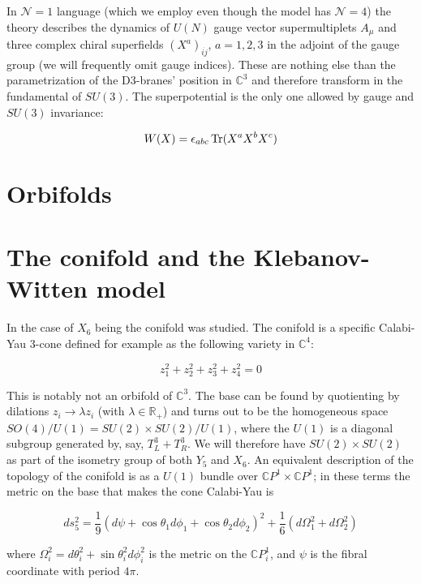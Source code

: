 In $\mathcal{N}=1$ language (which we employ even though the model has $\mathcal{N}=4$) the theory describes the dynamics of $U(N)$ gauge vector supermultiplets $A_\mu$ and three complex chiral superfields $(X^a)_{i\dot j}$, $a=1,2,3$ in the adjoint of the gauge group (we will frequently omit gauge indices). These are nothing else than the parametrization of the D3-branes' position in $\mathbb{C}^3$ and therefore transform in the fundamental of $SU(3)$. The superpotential is the only one allowed by gauge and $SU(3)$ invariance:

\begin{equation} W(X) = \epsilon_{abc} \operatorname{Tr} ( X^a X^b X^c) \end{equation}

\section{Orbifolds}

\section{The conifold and the Klebanov-Witten model}

In \cite{KW_SCFT} the case of $X_6$ being the conifold was studied. The conifold is a specific Calabi-Yau 3-cone defined for example as the following variety in $\mathbb{C}^4$:

\begin{equation}
	z_1^2 + z_2^2 + z_3^2 + z_4^2 = 0
\end{equation}

This is notably not an orbifold of $\mathbb{C}^3$. The base can be found by quotienting by dilations $z_i \rightarrow \lambda z_i$ (with $\lambda \in \mathbb{R}_+$) and turns out to be the homogeneous space $SO(4)/U(1) = SU(2)\times SU(2) / U(1)$, where the $U(1)$ is a diagonal subgroup generated by, say, $T^3_L + T^3_R$. We will therefore have $SU(2)\times SU(2)$ as part of the isometry group of both $Y_5$ and $X_6$. An equivalent description of the topology of the conifold is as a $U(1)$ bundle over $\mathbb{C}P^1 \times \mathbb{C}P^1$; in these terms the metric on the base that makes the cone Calabi-Yau is

\begin{equation}
	ds^2_5 = \frac{1}{9} (d\psi + \cos\theta_1 d\phi_1 + \cos\theta_2 d\phi_2)^2 + \frac{1}{6} (d\Omega_1^2 + d\Omega_2^2)
\end{equation}

where $\Omega_i^2 = d\theta_i^2 + \sin\theta_i^2 d\phi_i^2$ is the metric on the $\mathbb{C}P^1_i$, and $\psi$ is the fibral coordinate with period $4\pi$.\\

